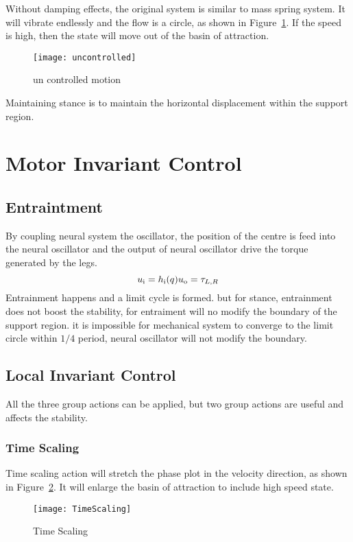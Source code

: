 Without damping effects, the original system is similar to mass spring system.
It will vibrate endlessly and the flow is a circle, as shown in Figure~\ref{fig:stancepostures}.
If the speed is high, then the state will move out of the basin of attraction.
\begin{figure}[!htbp]
  \begin{center}
     \texttt{[image: uncontrolled]}
    \caption{un controlled motion}
    \label{fig:stancepostures}
\end{center}
\end{figure}
Maintaining stance is to maintain the horizontal displacement within the support region.


\section {Motor Invariant Control}
\subsection{Entraintment}
By coupling neural system the oscillator, the position of the centre is feed into the neural oscillator and the output of neural oscillator drive the torque generated by the legs.
\[
u_{\mathrm{i}}=h_{\mathrm{i}}(q)\\
u_{\mathrm{o}}=\tau_{L,R}
\]
Entrainment happens and a limit cycle is formed.
but for stance, entrainment does not boost the stability, for entraiment will no modify the boundary of the support region.
it is impossible for mechanical system to converge to the limit circle within $1/4$ period, neural oscillator will not modify the boundary.


\subsection{Local Invariant Control}
All the three group actions can be applied, but two group actions are useful and affects the stability.
\subsubsection*{Time Scaling}
Time scaling action will stretch the phase plot in the velocity direction, as shown in Figure~\ref{fig:stanceTimeScaling}.
It will enlarge the basin of attraction to include high speed state.
\begin{figure}[!htbp]
  \begin{center}
      \texttt{[image: TimeScaling]}
    \caption{Time Scaling}
    \label{fig:stanceTimeScaling}
\end{center}
\end{figure}



